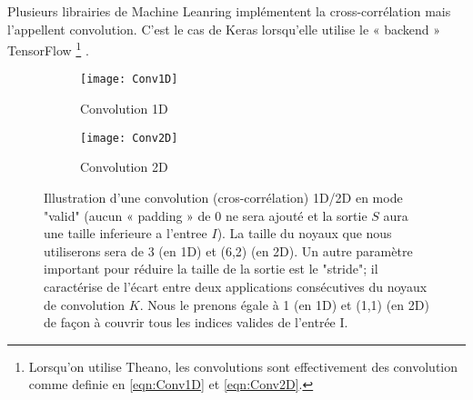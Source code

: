 Plusieurs librairies de Machine Leanring implémentent la cross-corrélation mais l'appellent convolution. C'est le cas de Keras lorsqu'elle utilise le « backend » TensorFlow \footnote{Lorsqu'on utilise Theano, les convolutions sont effectivement des convolution comme definie en \ref{eqn:Conv1D} et \ref{eqn:Conv2D}.} \parencite{Reference6}.
% 
% 


\begin{figure}[!h]
\begin{subfigure}{.5\textwidth}
  \centering
  \texttt{[image: Conv1D]}  
  \caption[Conv1D]{Convolution 1D \parencite{Reference10}}
\end{subfigure}
\begin{subfigure}{.5\textwidth}
  \centering
  \texttt{[image: Conv2D]}  
  \caption[Conv2D]{Convolution 2D \parencite{Reference11}}
\end{subfigure}
\label{fig:Conv1D2D}

\centering
\decoRule
\caption[Convolution1D2D]{Illustration d'une convolution (cros-corrélation) 1D/2D en mode "valid" (aucun « padding » de 0 ne sera ajouté et la sortie $S$ aura une taille inferieure a l'entree $I$). La taille du noyaux que nous utiliserons sera de 3 (en 1D) et (6,2) (en 2D). Un autre paramètre important pour réduire la taille de la sortie est le "stride"; il caractérise de l'écart entre deux applications consécutives du noyaux de convolution $K$. Nous le prenons égale à 1 (en 1D) et (1,1) (en 2D) de façon à couvrir tous les indices valides de l'entrée I.}
\end{figure}



